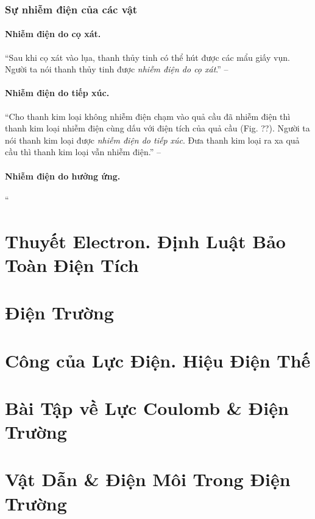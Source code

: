 \documentclass[oneside]{book}
\numberwithin{equation}{section}
\begin{document}
\subsubsection{Sự nhiễm điện của các vật}

\paragraph{Nhiễm điện do cọ xát.} ``Sau khi cọ xát vào lụa, thanh thủy tinh có thể hút được các mẩu giấy vụn. Người ta nói thanh thủy tinh được \textit{nhiễm điện do cọ xát}.'' -- \cite[p. 6]{SGK_Vat_Ly_11_nang_cao}

\paragraph{Nhiễm điện do tiếp xúc.} ``Cho thanh kim loại không nhiễm điện chạm vào quả cầu đã nhiễm điện thì thanh kim loại nhiễm điện cùng dấu với điện tích của quả cầu (Fig. ??). Người ta nói thanh kim loại được \textit{nhiễm điện do tiếp xúc}. Đưa thanh kim loại ra xa quả cầu thì thanh kim loại vẫn nhiễm điện.'' -- \cite[p. 7]{SGK_Vat_Ly_11_nang_cao}

\paragraph{Nhiễm điện do hưởng ứng.} ``

\section{Thuyết Electron. Định Luật Bảo Toàn Điện Tích}

\section{Điện Trường}

\section{Công của Lực Điện. Hiệu Điện Thế}

\section{Bài Tập về Lực Coulomb \& Điện Trường}

\section{Vật Dẫn \& Điện Môi Trong Điện Trường}
\end{document}

